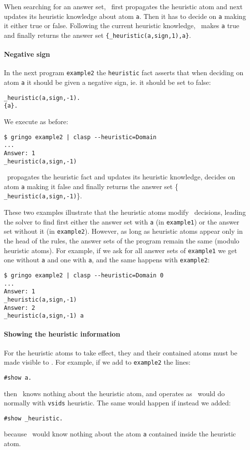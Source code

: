 When searching for an answer set, \clasp\ first propagates the heuristic atom and next updates its heuristic knowledge about atom \texttt{a}.
Then it has to decide on \texttt{a} making it either true or false.
Following the current heuristic knowledge,  \clasp\ makes \texttt{a} true and finally returns the answer set \texttt{\{\_heuristic(a,sign,1),a\}}.

\paragraph{Negative sign}

In the next program \texttt{example2} the \texttt{heuristic} fact  asserts that when deciding on atom \texttt{a}
it should be given a negative sign, ie. it should be set to false:
\begin{verbatim}
_heuristic(a,sign,-1).
{a}.
\end{verbatim}
We execute as before:
\begin{verbatim}
$ gringo example2 | clasp --heuristic=Domain
...
Answer: 1
_heuristic(a,sign,-1)
\end{verbatim}
\clasp\ propagates the heuristic fact and updates its heuristic knowledge,
decides on atom \texttt{a} making it false and finally returns the answer set \{ \texttt{\_heuristic(a,sign,-1)}\}.

These two examples illustrate that the heuristic atoms modify \clasp\ decisions,
leading the solver to find first either the answer set with \texttt{a} (in \texttt{example1}) or the answer set without it (in \texttt{example2}).
However, as long as heuristic atoms appear only in the head of the rules,
the answer sets of the program remain the same (modulo heuristic atoms).
For example, if we ask for all answer sets of \texttt{example1}  we get one without \texttt{a} and one with \texttt{a},
and the same happens with \texttt{example2}:
\begin{verbatim}
$ gringo example2 | clasp --heuristic=Domain 0
...
Answer: 1
_heuristic(a,sign,-1)
Answer: 2
_heuristic(a,sign,-1) a
\end{verbatim}

\paragraph{Showing the heuristic information}

For the heuristic atoms to take effect, they and their contained atoms must be  made visible to \clasp. For example, if we add to \texttt{example2} the lines:
\begin{verbatim}
#show a.
\end{verbatim}
then \clasp\ knows nothing about the heuristic atom, and operates as \clasp\ would do normally with \texttt{vsids} heuristic. The same would happen if instead we added:
\begin{verbatim}
#show _heuristic.
\end{verbatim}
 because \clasp\ would know nothing about the atom \texttt{a} contained inside the heuristic atom.

